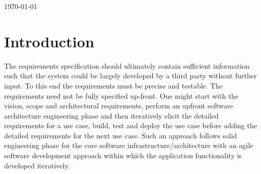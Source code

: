 \documentclass[a4paper,12pt]{article}
\begin{document}
\begin{titlepage}

{\large \today}\\[3cm] %


 

\vfill %

\end{titlepage}

\newpage



\section{Introduction}

The requirements specification should ultimately contain sufficient information such that the
system could be largely developed by a third party without further input. To this end the
requirements must be precise and testable.
The requirements need not be fully specified up-front. One might start with the vision, scope
and architectural requirements, perform an upfront software architecture engineering phase and
then iteratively elicit the detailed requirements for a use case, build, test and deploy the use
case before adding the detailed requirements for the next use case. Such an approach follows
solid engineering phase for the core software infrastructure/architecture with an agile software
development approach within which the application functionality is developed iteratively.
\end{document}
